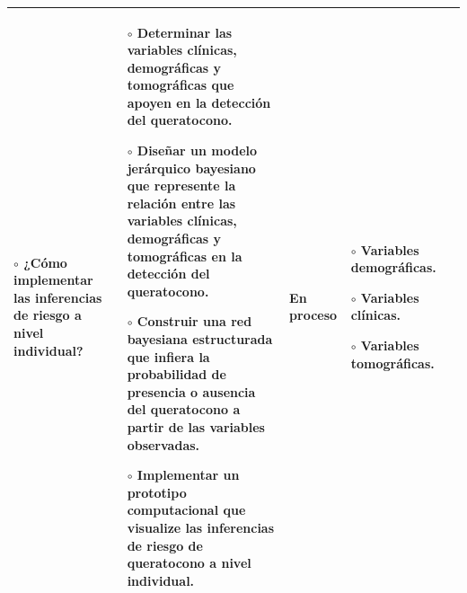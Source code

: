 \begin{landscape}
\begin{table}[h!]
\begin{tabular}{|p{4.2cm}|p{4.5cm}|p{4.5cm}|p{3cm}|p{4.2cm}|}
{    $\circ$ ¿Cómo implementar las inferencias de riesgo a nivel individual?} & \multicolumn{1}{p{4.5cm}|}{
    $\circ$ Determinar las variables clínicas, demográficas y tomográficas que apoyen en la detección del queratocono.\vspace{0.2cm}

    $\circ$ Diseñar un modelo jerárquico bayesiano que represente la relación entre las variables clínicas, demográficas y tomográficas en la detección del queratocono.\vspace{0.2cm}

    $\circ$ Construir una red bayesiana estructurada que infiera la probabilidad de presencia o ausencia del queratocono a partir de las variables observadas.\vspace{0.2cm}

    $\circ$ Implementar un prototipo computacional que visualize las inferencias de riesgo de queratocono a nivel individual.

    } & \multicolumn{1}{p{4.5cm}|}{
    En proceso

    } & \multicolumn{1}{p{3cm}|}{
    \vspace{0.2cm}
    $\circ$ Variables demográficas.\vspace{0.2cm}

    $\circ$ Variables clínicas.\vspace{0.2cm}

    $\circ$ Variables tomográficas.
    }  & \\ \hline
\end{tabular}
\end{table}

\end{landscape}
